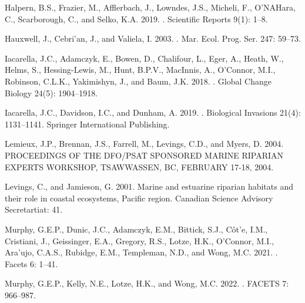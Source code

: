 \documentclass[12pt]{article}\usepackage[]{graphicx}\usepackage[]{color}
\begin{document}
\begin{CSLReferences}{1}{0}
%
Halpern, B.S., Frazier, M., Afflerbach, J., Lowndes, J.S., Micheli, F., O'NAHara, C., Scarborough, C., and Selko, K.A. 2019. . Scientific Reports 9(1): 1--8.

%
Hauxwell, J., Cebri'an, J., and Valiela, I. 2003. . Mar. Ecol. Prog. Ser. 247: 59--73.

%
Iacarella, J.C., Adamczyk, E., Bowen, D., Chalifour, L., Eger, A., Heath, W., Helms, S., Hessing-Lewis, M., Hunt, B.P.V., MacInnis, A., O'Connor, M.I., Robinson, C.L.K., Yakimishyn, J., and Baum, J.K. 2018. . Global Change Biology 24(5): 1904--1918.

%
Iacarella, J.C., Davidson, I.C., and Dunham, A. 2019. . Biological Invasions 21(4): 1131--1141. {Springer International Publishing}.

%
Lemieux, J.P., Brennan, J.S., Farrell, M., Levings, C.D., and Myers, D. 2004. {PROCEEDINGS OF THE DFO}/{PSAT SPONSORED MARINE RIPARIAN EXPERTS WORKSHOP}, {TSAWWASSEN}, {BC}, {FEBRUARY} 17-18, 2004.

%
Levings, C., and Jamieson, G. 2001. Marine and estuarine riparian habitats and their role in coastal ecosystems, {Pacific} region. Canadian Science Advisory Secretartiat: 41.

%
Murphy, G.E.P., Dunic, J.C., Adamczyk, E.M., Bittick, S.J., Côt'e, I.M., Cristiani, J., Geissinger, E.A., Gregory, R.S., Lotze, H.K., O'Connor, M.I., Ara'ujo, C.A.S., Rubidge, E.M., Templeman, N.D., and Wong, M.C. 2021. . Facets 6: 1--41.

%
Murphy, G.E.P., Kelly, N.E., Lotze, H.K., and Wong, M.C. 2022. . FACETS 7: 966--987.


\end{CSLReferences}
\end{document}
